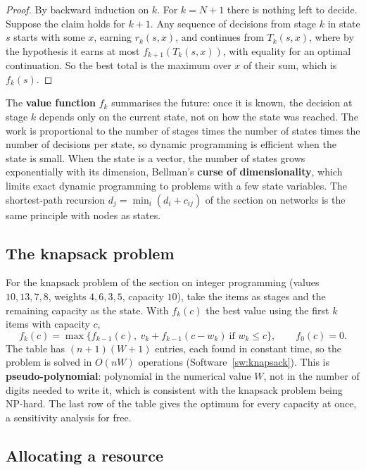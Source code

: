 \documentclass[11pt,a4paper]{article}
\numberwithin{equation}{section}
\theoremstyle{definition}
\begin{document}
\begin{proof}
By backward induction on $k$. For $k = N + 1$ there is nothing left to decide. Suppose the claim holds for $k + 1$. Any sequence of decisions from stage $k$ in state $s$ starts with some $x$, earning $r_k(s, x)$, and continues from $T_k(s, x)$, where by the hypothesis it earns at most $f_{k + 1}(T_k(s, x))$, with equality
for an optimal continuation. So the best total is the maximum over $x$ of their sum, which is $f_k(s)$.
\end{proof}

The \textbf{value function} $f_k$ summarises the future: once it is known, the decision at stage $k$ depends only on the current state, not on how the state was reached. The work is proportional to the number of stages times the number of states times the number of decisions per state, so dynamic programming is efficient
when the state is small. When the state is a vector, the number of states grows exponentially with its dimension, Bellman's \textbf{curse of dimensionality}, which limits exact dynamic programming to problems with a few state variables. The shortest-path recursion $d_j = \min_i(d_i + c_{ij})$ of the section on networks is the same principle
with nodes as states.

\subsection{The knapsack problem}
\label{ssec:knapsackdp}

For the knapsack problem of the section on integer programming (values $10, 13, 7, 8$, weights $4, 6, 3, 5$, capacity $10$), take the items as stages and the remaining capacity as the state. With $f_k(c)$ the best value using the first $k$ items with capacity $c$,
\[
f_k(c) = \max\bigl\{f_{k - 1}(c),\ v_k + f_{k - 1}(c - w_k)\ \text{if } w_k \leq c\bigr\}, \qquad f_0(c) = 0 .
\]
The table has $(n + 1)(W + 1)$ entries, each found in constant time, so the problem is solved in $O(nW)$ operations (Software~\ref{sw:knapsack}). This is \textbf{pseudo-polynomial}: polynomial in the numerical value $W$, not in the number of digits needed to write it, which is consistent with the knapsack problem being NP-hard.
The last row of the table gives the optimum for every capacity at once, a sensitivity analysis for free.

\subsection{Allocating a resource}
\label{ssec:allocation}
\end{document}
